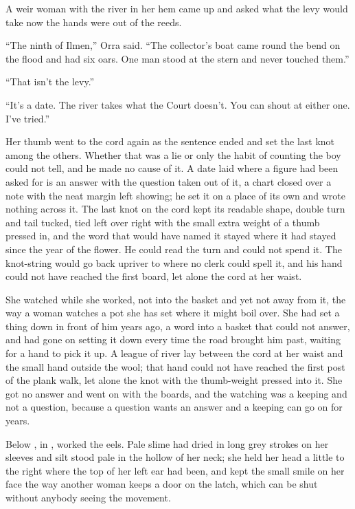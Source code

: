 A weir woman with the river in her hem came up and asked what the levy would take now the hands were out of the reeds.

“The ninth of Ilmen,” Orra said. “The collector's boat came round the bend on the flood and had six oars. One man stood at the stern and never touched them.”

“That isn't the levy.”

“It's a date. The river takes what the Court doesn't. You can shout at either one. I've tried.”

Her thumb went to the cord again as the sentence ended and set the last knot among the others. Whether that was a lie or only the habit of counting the boy could not tell, and he made no cause of it. A date laid where a figure had been asked for is an answer with the question taken out of it, a chart closed over a note with the neat margin left showing; he set it on a place of its own and wrote nothing across it. The last knot on the cord kept its readable shape, double turn and tail tucked, tied left over right with the small extra weight of a thumb pressed in, and the word that would have named it stayed where it had stayed since the year of the flower. He could read the turn and could not spend it. The knot-string would go back upriver to  where no clerk could spell it, and his hand could not have reached the first board, let alone the cord at her waist.

She watched while she worked, not into the basket and yet not away from it, the way a woman watches a pot she has set where it might boil over. She had set a thing down in front of him years ago, a word into a basket that could not answer, and had gone on setting it down every time the road brought him past, waiting for a hand to pick it up. A league of river lay between the cord at her waist and the small hand outside the wool; that hand could not have reached the first post of the plank walk, let alone the knot with the thumb-weight pressed into it. She got no answer and went on with the boards, and the watching was a keeping and not a question, because a question wants an answer and a keeping can go on for years.

Below , in ,  worked the eels. Pale slime had dried in long grey strokes on her sleeves and silt stood pale in the hollow of her neck; she held her head a little to the right where the top of her left ear had been, and kept the small smile on her face the way another woman keeps a door on the latch, which can be shut without anybody seeing the movement.

